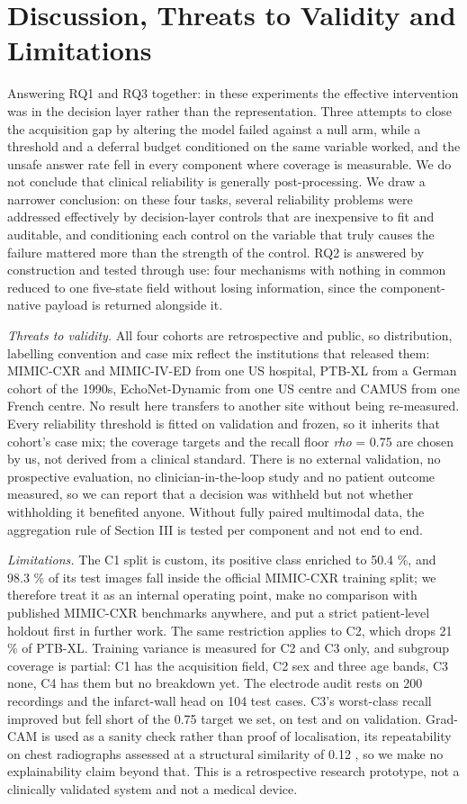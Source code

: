 \documentclass[conference,a4paper]{IEEEtran}
\begin{document}
\section{Discussion, Threats to Validity and Limitations}
Answering RQ1 and RQ3 together: in these experiments the effective intervention was in the decision layer rather than the representation. Three attempts to close the acquisition gap by altering the model failed against a null arm, while a threshold and a deferral budget conditioned on the same variable worked, and the unsafe answer rate fell in every component where coverage is measurable. We do not conclude that clinical reliability is generally post-processing. We draw a narrower conclusion: on these four tasks, several reliability problems were addressed effectively by decision-layer controls that are inexpensive to fit and auditable, and conditioning each control on the variable that truly causes the failure mattered more than the strength of the control. RQ2 is answered by construction and tested through use: four mechanisms with nothing in common reduced to one five-state field without losing information, since the component-native payload is returned alongside it.

\textit{Threats to validity.} All four cohorts are retrospective and public, so distribution, labelling convention and case mix reflect the institutions that released them: MIMIC-CXR and MIMIC-IV-ED from one US hospital, PTB-XL from a German cohort of the 1990s, EchoNet-Dynamic from one US centre and CAMUS from one French centre. No result here transfers to another site without being re-measured. Every reliability threshold is fitted on validation and frozen, so it inherits that cohort's case mix; the coverage targets and the recall floor \textit{rho} = 0.75 are chosen by us, not derived from a clinical standard. There is no external validation, no prospective evaluation, no clinician-in-the-loop study and no patient outcome measured, so we can report that a decision was withheld but not whether withholding it benefited anyone. Without fully paired multimodal data, the aggregation rule of Section III is tested per component and not end to end.

\textit{Limitations.} The C1 split is custom, its positive class enriched to 50.4 \%, and 98.3 \% of its test images fall inside the official MIMIC-CXR training split; we therefore treat it as an internal operating point, make no comparison with published MIMIC-CXR benchmarks anywhere, and put a strict patient-level holdout first in further work. The same restriction applies to C2, which drops 21 \% of PTB-XL. Training variance is measured for C2 and C3 only, and subgroup coverage is partial: C1 has the acquisition field, C2 sex and three age bands, C3 none, C4 has them but no breakdown yet. The electrode audit rests on 200 recordings and the infarct-wall head on 104 test cases. C3's worst-class recall improved but fell short of the 0.75 target we set, on test and on validation. Grad-CAM is used as a sanity check rather than proof of localisation, its repeatability on chest radiographs assessed at a structural similarity of 0.12 \cite{ref28}, so we make no explainability claim beyond that. This is a retrospective research prototype, not a clinically validated system and not a medical device.
\end{document}
